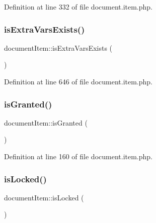 Definition at line 332 of file document.\+item.\+php.

\hypertarget{classdocumentItem_ac51058096d79221c90595564e3dbdb82}{}\label{classdocumentItem_ac51058096d79221c90595564e3dbdb82} 
\subsubsection{\texorpdfstring{is\+Extra\+Vars\+Exists()}{isExtraVarsExists()}}
{\footnotesize\ttfamily document\+Item\+::is\+Extra\+Vars\+Exists (\begin{DoxyParamCaption}{ }\end{DoxyParamCaption})}



Definition at line 646 of file document.\+item.\+php.

\hypertarget{classdocumentItem_a571c72e54e18c33bb93303489edda406}{}\label{classdocumentItem_a571c72e54e18c33bb93303489edda406} 
\subsubsection{\texorpdfstring{is\+Granted()}{isGranted()}}
{\footnotesize\ttfamily document\+Item\+::is\+Granted (\begin{DoxyParamCaption}{ }\end{DoxyParamCaption})}



Definition at line 160 of file document.\+item.\+php.

\hypertarget{classdocumentItem_ad99f7615ed11289ce2976096d36d5185}{}\label{classdocumentItem_ad99f7615ed11289ce2976096d36d5185} 
\subsubsection{\texorpdfstring{is\+Locked()}{isLocked()}}
{\footnotesize\ttfamily document\+Item\+::is\+Locked (\begin{DoxyParamCaption}{ }\end{DoxyParamCaption})}



